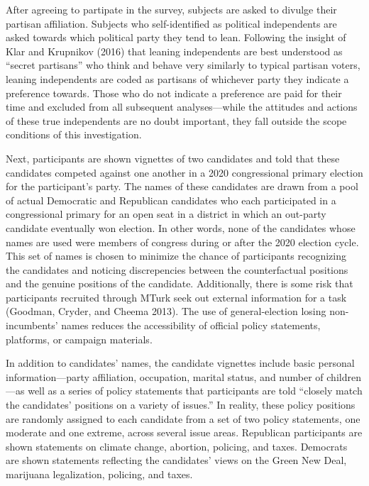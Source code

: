 \documentclass[
]{article}
\begin{document}
After agreeing to partipate in the survey, subjects are asked to divulge their partisan affiliation. Subjects who self-identified as political independents are asked towards which political party they tend to lean. Following the insight of Klar and Krupnikov (2016) that leaning independents are best understood as ``secret partisans'' who think and behave very similarly to typical partisan voters, leaning independents are coded as partisans of whichever party they indicate a preference towards. Those who do not indicate a preference are paid for their time and excluded from all subsequent analyses---while the attitudes and actions of these true independents are no doubt important, they fall outside the scope conditions of this investigation.

Next, participants are shown vignettes of two candidates and told that these candidates competed against one another in a 2020 congressional primary election for the participant's party. The names of these candidates are drawn from a pool of actual Democratic and Republican candidates who each participated in a congressional primary for an open seat in a district in which an out-party candidate eventually won election. In other words, none of the candidates whose names are used were members of congress during or after the 2020 election cycle. This set of names is chosen to minimize the chance of participants recognizing the candidates and noticing discrepencies between the counterfactual positions and the genuine positions of the candidate. Additionally, there is some risk that participants recruited through MTurk seek out external information for a task (Goodman, Cryder, and Cheema 2013). The use of general-election losing non-incumbents' names reduces the accessibility of official policy statements, platforms, or campaign materials.

In addition to candidates' names, the candidate vignettes include basic personal information---party affiliation, occupation, marital status, and number of children---as well as a series of policy statements that participants are told ``closely match the candidates' positions on a variety of issues.'' In reality, these policy positions are randomly assigned to each candidate from a set of two policy statements, one moderate and one extreme, across several issue areas. Republican participants are shown statements on climate change, abortion, policing, and taxes. Democrats are shown statements reflecting the candidates' views on the Green New Deal, marijuana legalization, policing, and taxes.
\end{document}
